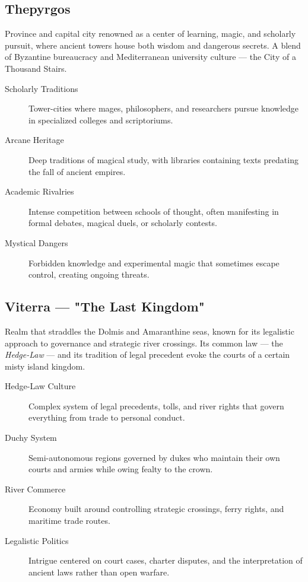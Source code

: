 \subsection*{Thepyrgos}

Province and capital city renowned as a center of learning, magic, and scholarly pursuit, where ancient towers house both wisdom and dangerous secrets. A blend of Byzantine bureaucracy and Mediterranean university culture — the City of a Thousand Stairs.

\begin{description}
\item[Scholarly Traditions] Tower-cities where mages, philosophers, and researchers pursue knowledge in specialized colleges and scriptoriums.
\item[Arcane Heritage] Deep traditions of magical study, with libraries containing texts predating the fall of ancient empires.
\item[Academic Rivalries] Intense competition between schools of thought, often manifesting in formal debates, magical duels, or scholarly contests.
\item[Mystical Dangers] Forbidden knowledge and experimental magic that sometimes escape control, creating ongoing threats.
\end{description}

\subsection*{Viterra — "The Last Kingdom"}

Realm that straddles the Dolmis and Amaranthine seas, known for its legalistic approach to governance and strategic river crossings. Its common law — the \emph{Hedge-Law} — and its tradition of legal precedent evoke the courts of a certain misty island kingdom.

\begin{description}
\item[Hedge-Law Culture] Complex system of legal precedents, tolls, and river rights that govern everything from trade to personal conduct.
\item[Duchy System] Semi-autonomous regions governed by dukes who maintain their own courts and armies while owing fealty to the crown.
\item[River Commerce] Economy built around controlling strategic crossings, ferry rights, and maritime trade routes.
\item[Legalistic Politics] Intrigue centered on court cases, charter disputes, and the interpretation of ancient laws rather than open warfare.
\end{description}

